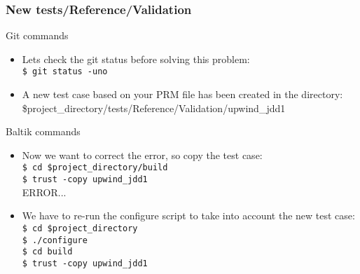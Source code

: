 \documentclass[10pt, hyperref={unicode=true,pdfusetitle, bookmarks=true,bookmarksnumbered=false,bookmarksopen=false, breaklinks=false,pdfborder={0 0 1},backref=true,colorlinks=true,linkcolor=darkblue,pageanchor, urlcolor=darkblue}]{beamer}
\begin{document}
\begin{frame}
\frametitle{New tests/Reference/Validation}

\begin{alertblock}{Git commands}
\begin{itemize}
\item Lets check the git status before solving this problem:\\
\texttt{\$ git status -uno}\\
\item A new test case based on your PRM file has been created in the directory:\\
\$project\_directory/tests/Reference/Validation/upwind\_jdd1
\end{itemize}
\end{alertblock}

\begin{block}{Baltik commands}
\begin{itemize}
\item Now we want to correct the error, so copy the test case:\\
\texttt{\$ cd \$project\_directory/build}\\
\texttt{\$ trust -copy upwind\_jdd1}\\
ERROR...
\item We have to re-run the configure script to take into account the new test case:\\
\texttt{\$ cd \$project\_directory}\\
\texttt{\$ ./configure}\\
\texttt{\$ cd build}\\
\texttt{\$ trust -copy upwind\_jdd1}

\end{itemize}
\end{block}

\end{frame}
\end{document}
